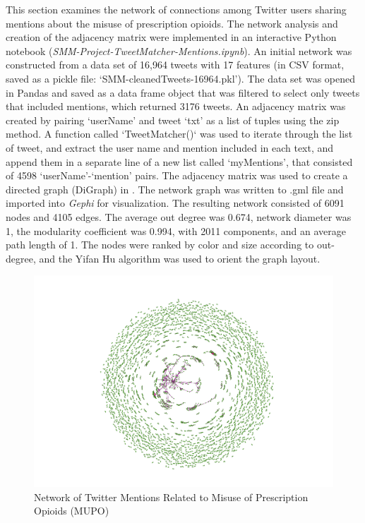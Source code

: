 \documentclass[sigconf]{acmart}
\begin{document}
This section examines the network of connections among Twitter users sharing 
mentions about the misuse of prescription opioids. The network analysis and 
creation of the adjacency matrix were implemented in an interactive Python 
notebook (\emph{SMM-Project-TweetMatcher-Mentions.ipynb}). An initial network 
was constructed from a data set of 16,964 tweets with 17 features (in CSV 
format, saved as a pickle file: `SMM-cleanedTweets-16964.pkl'). The data set 
was opened in Pandas and saved as a data frame object that was filtered to 
select only tweets that included mentions, which returned 3176 tweets. An 
adjacency matrix was created by pairing `userName' and tweet `txt' as a list 
of tuples using the zip method. A function called `TweetMatcher()` was used 
to iterate through the list of tweet, and extract the user name and mention 
included in each text, and append them in a separate line of a new list called 
‘myMentions’, that consisted of 4598 `userName'-`mention' pairs. The adjacency 
matrix was used to create a directed graph (DiGraph) in . 
The network graph was written to .gml file and imported into \emph{Gephi} for 
visualization. The resulting network consisted of 6091 nodes and 4105 edges. 
The average out degree was 0.674, network diameter was 1, the modularity 
coefficient was 0.994, with 2011 components, and an average path length of 1. 
The nodes were ranked by color and size according to out-degree, and the 
Yifan Hu algorithm was used to orient the graph layout.

\begin{figure}[!ht]
  \centering\includegraphics[width=\columnwidth]{images/Figure7.pdf}
  \caption{Network of Twitter Mentions Related to Misuse of Prescription 
  Opioids (MUPO)}
  \label{f:Figure7}
\end{figure}
\end{document}
